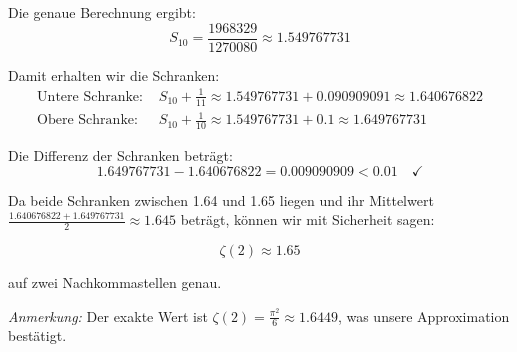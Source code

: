 \documentclass{article}
\begin{document}
Die genaue Berechnung ergibt:
\[
S_{10} = \frac{1968329}{1270080} \approx 1.549767731
\]

Damit erhalten wir die Schranken:
\begin{align}
\text{Untere Schranke: } & S_{10} + \frac{1}{11} \approx 1.549767731 + 0.090909091 \approx 1.640676822 \\
\text{Obere Schranke: } & S_{10} + \frac{1}{10} \approx 1.549767731 + 0.1 \approx 1.649767731
\end{align}

Die Differenz der Schranken beträgt:
\[
1.649767731 - 1.640676822 = 0.009090909 < 0.01 \quad \checkmark
\]

Da beide Schranken zwischen 1.64 und 1.65 liegen und ihr Mittelwert $\frac{1.640676822 + 1.649767731}{2} \approx 1.645$ beträgt, können wir mit Sicherheit sagen:

\[
\boxed{\zeta(2) \approx 1.65}
\]

auf zwei Nachkommastellen genau.

\textit{Anmerkung:} Der exakte Wert ist $\zeta(2) = \frac{\pi^2}{6} \approx 1.6449$, was unsere Approximation bestätigt.
\end{document}
